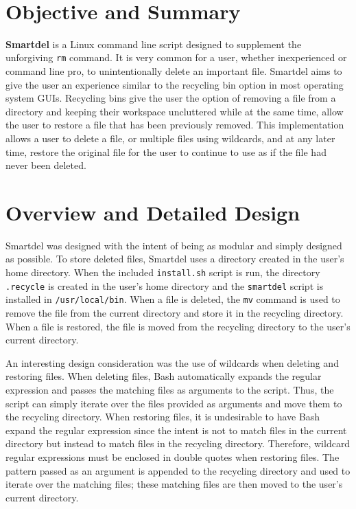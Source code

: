 \documentclass[12pt]{article}
\begin{document}
\ \\
\section{Objective and Summary}

\textbf{Smartdel} is a Linux command line script designed to supplement the unforgiving \texttt{rm} command. It is very
common for a user, whether inexperienced or command line pro, to unintentionally delete an important file. Smartdel
aims to give the user an experience similar to the recycling bin option in most operating system GUIs. Recycling bins give
the user the option of removing a file from a directory and keeping their workspace uncluttered while at the same time,
allow the user to restore a file that has been previously removed. This implementation allows a user to delete a file, or multiple
files using wildcards, and at any later time, restore the original file for the user to continue to use as if the file had never been
deleted.

\section{Overview and Detailed Design}

Smartdel was designed with the intent of being as modular and simply designed as possible. To store deleted files, Smartdel
uses a directory created in the user's home directory. When the included \texttt{install.sh} script is run, the directory
\texttt{.recycle} is created in the user's home directory and the \texttt{smartdel} script is installed in \texttt{/usr/local/bin}.
When a file is deleted, the \texttt{mv} command is used to remove the file from the current directory and store it in the
recycling directory. When a file is restored, the file is moved from the recycling directory to the user's current directory.

An interesting design consideration was the use of wildcards when deleting and restoring files. When deleting files, Bash
automatically expands the regular expression and passes the matching files as arguments to the script. Thus, the script
can simply iterate over the files provided as arguments and move them to the recycling directory. When restoring files,
it is undesirable to have Bash expand the regular expression since the intent is not to match files in the current directory
but instead to match files in the recycling directory. Therefore, wildcard regular expressions must be enclosed in double
quotes when restoring files. The pattern passed as an argument is appended to the recycling directory and used to
iterate over the matching files; these matching
\newpage
\thispagestyle{empty}
files are then moved to the user's current directory.
\end{document}
